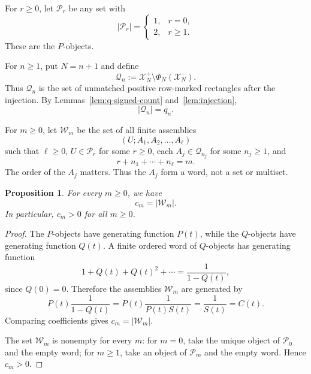 \documentclass[11pt]{article}
\newtheorem{proposition}{Proposition}
\newcommand{\calP}{\mathcal{P}}
\newcommand{\calQ}{\mathcal{Q}}
\newcommand{\calW}{\mathcal{W}}
\newcommand{\calX}{\mathcal{X}}
\begin{document}
For $r\geq0$, let $\calP_r$ be any set with
\[
  |\calP_r|=
  \begin{cases}
    1,&r=0,\\
    2,&r\geq1.
  \end{cases}
\]
These are the $P$-objects.

For $n\geq1$, put $N=n+1$ and define
\[
  \calQ_n:=\calX_N^+\setminus\Phi_N(\calX_N^-).
\]
Thus $\calQ_n$ is the set of unmatched positive row-marked rectangles after the injection.  By Lemmas~\ref{lem:q-signed-count} and~\ref{lem:injection},
\[
  |\calQ_n|=q_n.
\]

For $m\geq0$, let $\calW_m$ be the set of all finite assemblies
\[
  (U;A_1,A_2,\ldots,A_\ell)
\]
such that $\ell\geq0$, $U\in\calP_r$ for some $r\geq0$, each $A_j\in\calQ_{n_j}$ for some $n_j\geq1$, and
\[
  r+n_1+\cdots+n_\ell=m.
\]
The order of the $A_j$ matters.  Thus the $A_j$ form a word, not a set or multiset.

\begin{proposition}\label{prop:main}
For every $m\geq0$, we have
\[
  c_m=|\calW_m|.
\]
In particular, $c_m>0$ for all $m\geq0$.
\end{proposition}

\begin{proof}
The $P$-objects have generating function $P(t)$, while the $Q$-objects have generating function $Q(t)$.  A finite ordered word of $Q$-objects has generating function
\[
  1+Q(t)+Q(t)^2+\cdots=\frac1{1-Q(t)},
\]
since $Q(0)=0$.  Therefore the assemblies $\calW_m$ are generated by
\[
  P(t)\frac1{1-Q(t)}
  =P(t)\frac1{P(t)S(t)}
  =\frac1{S(t)}
  =C(t).
\]
Comparing coefficients gives $c_m=|\calW_m|$.

The set $\calW_m$ is nonempty for every $m$: for $m=0$, take the unique object of $\calP_0$ and the empty word; for $m\geq1$, take an object of $\calP_m$ and the empty word.  Hence $c_m>0$.
\end{proof}
\end{document}
